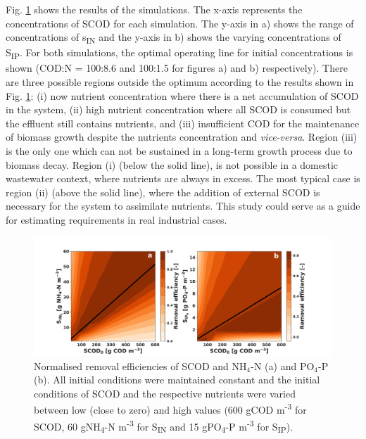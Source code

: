 Fig. \ref{fig:ch2_cnp} shows the results of the simulations. The x-axis represents the concentrations of SCOD for each simulation. The y-axis in a) shows the range of concentrations of s\textsubscript{IN} and the y-axis in b) shows the varying concentrations of S\textsubscript{IP}. For both simulations, the optimal operating line for initial concentrations is shown (COD:N = 100:8.6 and 100:1.5 for figures a) and b) respectively). There are three possible regions outside the optimum according to the results shown in Fig. \ref{fig:ch2_cnp}: (i) now nutrient concentration where there is a net accumulation of SCOD in the system, (ii) high nutrient concentration where all SCOD is consumed but the effluent still contains nutrients, and (iii) insufficient COD for the maintenance of biomass growth despite the nutrients concentration and \textit{vice-versa}. Region (iii) is the only one which can not be sustained in a long-term growth process due to biomass decay. Region (i) (below the solid line), is not possible in a domestic wastewater context, where nutrients are always in excess. The most typical case is region (ii) (above the solid line), where the addition of external SCOD is necessary for the system to assimilate nutrients. This study could serve as a guide for estimating requirements in real industrial cases.  



\begin{figure}[tp]
    \hspace*{-2cm} 
    \includegraphics[width=1.25\linewidth]{./Chap2/simulations/ch2_sin_cod.pdf}
    \caption{Normalised removal efficiencies of SCOD and $\mathrm{NH_4\mbox{-}N}$ (a) and $\mathrm{PO_4\mbox{-}P}$ (b). All initial conditions were maintained constant and the initial conditions of SCOD and the respective nutrients were varied between low (close to zero) and high values (600 gCOD m\textsuperscript{-3} for SCOD, 60 gNH\textsubscript{4}-N m\textsuperscript{-3} for S\textsubscript{IN} and 15 gPO\textsubscript{4}-P m\textsuperscript{-3} for S\textsubscript{IP}).}
    \label{fig:ch2_cnp}
\end{figure}


